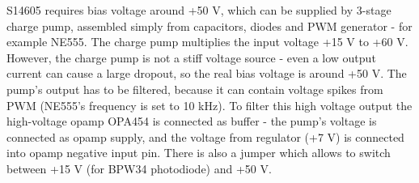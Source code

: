 \par
S14605 requires bias voltage around +50 V, which can be supplied by 3-stage charge pump, assembled simply from capacitors, diodes and PWM generator - for example NE555. The charge pump multiplies the input voltage +15 V to +60 V. However, the charge pump is not a stiff voltage source - even a low output current can cause a large dropout, so the real bias voltage is around +50 V. The pump's output has to be filtered, because it can contain voltage spikes from PWM (NE555's frequency is set to 10 kHz). To filter this high voltage output the high-voltage opamp OPA454 is connected as buffer - the pump's voltage is connected as opamp supply, and the voltage from regulator (+7 V) is connected into opamp negative input pin. There is also a jumper which allows to switch between +15 V (for BPW34 photodiode) and +50 V.

\section{}



\section{}


